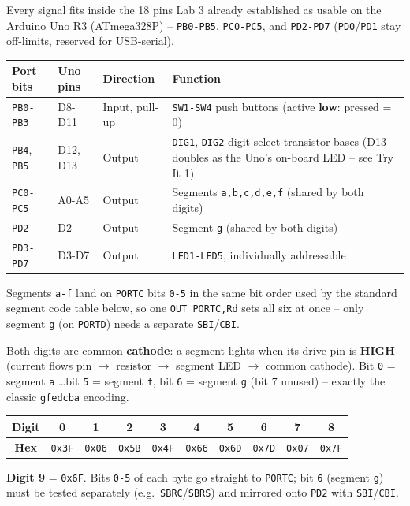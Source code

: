 \documentclass[11pt]{article}
\begin{document}
\begin{summary}
Every signal fits inside the 18 pins Lab 3 already established as usable on the
Arduino Uno R3 (ATmega328P) -- \texttt{PB0-PB5}, \texttt{PC0-PC5}, and
\texttt{PD2-PD7} (\texttt{PD0}/\texttt{PD1} stay off-limits, reserved for USB-serial).
\begin{center}
\begin{tabular}{@{}p{2.0cm}p{1.8cm}p{2.2cm}p{7.9cm}@{}}
\toprule
\textbf{Port bits} & \textbf{Uno pins} & \textbf{Direction} & \textbf{Function} \\
\midrule
\texttt{PB0-PB3} & D8-D11 & Input, pull-up & \texttt{SW1-SW4} push buttons (active
\textbf{low}: pressed = 0) \\
\texttt{PB4}, \texttt{PB5} & D12, D13 & Output & \texttt{DIG1}, \texttt{DIG2} digit-select
transistor bases (D13 doubles as the Uno's on-board LED -- see Try It 1) \\
\texttt{PC0-PC5} & A0-A5 & Output & Segments \texttt{a,b,c,d,e,f} (shared by both
digits) \\
\texttt{PD2} & D2 & Output & Segment \texttt{g} (shared by both digits) \\
\texttt{PD3-PD7} & D3-D7 & Output & \texttt{LED1-LED5}, individually addressable \\
\bottomrule
\end{tabular}
\end{center}
Segments \texttt{a-f} land on \texttt{PORTC} bits \texttt{0-5} in the same bit order
used by the standard segment code table below, so one \texttt{OUT PORTC,Rd} sets all
six at once -- only segment \texttt{g} (on \texttt{PORTD}) needs a separate
\texttt{SBI}/\texttt{CBI}.
\end{summary}

\begin{summary}
Both digits are common-\textbf{cathode}: a segment lights when its drive pin is
\textbf{HIGH} (current flows pin $\to$ resistor $\to$ segment LED $\to$ common
cathode). Bit \texttt{0} = segment \texttt{a} \ldots bit \texttt{5} = segment
\texttt{f}, bit \texttt{6} = segment \texttt{g} (bit 7 unused) -- exactly the
classic \texttt{gfedcba} encoding.
\begin{center}
\begin{tabular}{@{}cccccccccc@{}}
\toprule
\textbf{Digit} & 0 & 1 & 2 & 3 & 4 & 5 & 6 & 7 & 8 \\
\midrule
\textbf{Hex} & \texttt{0x3F} & \texttt{0x06} & \texttt{0x5B} & \texttt{0x4F} &
\texttt{0x66} & \texttt{0x6D} & \texttt{0x7D} & \texttt{0x07} & \texttt{0x7F} \\
\bottomrule
\end{tabular}
\end{center}
\textbf{Digit 9} = \texttt{0x6F}. Bits \texttt{0-5} of each byte go straight to
\texttt{PORTC}; bit \texttt{6} (segment \texttt{g}) must be tested separately (e.g.\
\texttt{SBRC}/\texttt{SBRS}) and mirrored onto \texttt{PD2} with \texttt{SBI}/\texttt{CBI}.
\end{summary}
\end{document}
